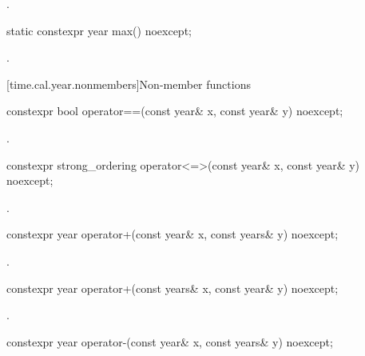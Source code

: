 \begin{itemdescr}
\pnum
\returns
{}.
\end{itemdescr}

%
\begin{itemdecl}
static constexpr year max() noexcept;
\end{itemdecl}

\begin{itemdescr}
\pnum
\returns
{}.
\end{itemdescr}

[time.cal.year.nonmembers]{Non-member functions}

%
\begin{itemdecl}
constexpr bool operator==(const year& x, const year& y) noexcept;
\end{itemdecl}

\begin{itemdescr}
\pnum
\returns
{}.
\end{itemdescr}

%
\begin{itemdecl}
constexpr strong_ordering operator<=>(const year& x, const year& y) noexcept;
\end{itemdecl}

\begin{itemdescr}
\pnum
\returns
{}.
\end{itemdescr}

%
\begin{itemdecl}
constexpr year operator+(const year& x, const years& y) noexcept;
\end{itemdecl}

\begin{itemdescr}
\pnum
\returns
{}.
\end{itemdescr}

%
\begin{itemdecl}
constexpr year operator+(const years& x, const year& y) noexcept;
\end{itemdecl}

\begin{itemdescr}
\pnum
\returns
{}.
\end{itemdescr}

%
\begin{itemdecl}
constexpr year operator-(const year& x, const years& y) noexcept;
\end{itemdecl}

